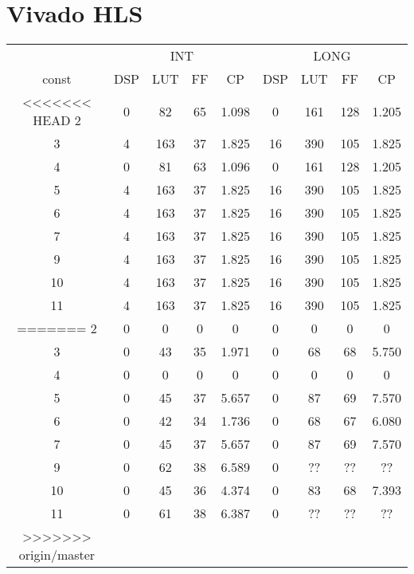 \documentclass[10pt,a4paper,twoside]{article}
\begin{document}
\section{Vivado HLS}
\begin{tabular}{|c||c|c|c|c|c|c|c|c|}
    \hline
     & \multicolumn{4}{|c}{INT} & \multicolumn{4}{|c||}{LONG}\\
    const & DSP & LUT & FF & CP & DSP & LUT & FF & CP \\
    \hline
<<<<<<< HEAD
    2 & 0 & 82 & 65 & 1.098 & 0 & 161 & 128 & 1.205 \\
    \hline
    3 & 4 & 163 & 37 & 1.825 & 16 & 390 & 105 & 1.825 \\
    \hline
    4 & 0 & 81 & 63 & 1.096 & 0 & 161 & 128 & 1.205 \\
    \hline
    5 & 4 & 163 & 37 & 1.825 & 16 & 390 & 105 & 1.825 \\
    \hline
    6 & 4 & 163 & 37 & 1.825 & 16 & 390 & 105 & 1.825 \\
    \hline
    7 & 4 & 163 & 37 & 1.825 & 16 & 390 & 105 & 1.825 \\
    \hline
    9 & 4 & 163 & 37 & 1.825 & 16 & 390 & 105 & 1.825 \\
    \hline
    10 & 4 & 163 & 37 & 1.825 & 16 & 390 & 105 & 1.825 \\
    \hline
    11 & 4 & 163 & 37 & 1.825 & 16 & 390 & 105 & 1.825\\
=======
    2 & 0 & 0 & 0 & 0 & 0 & 0 & 0 & 0 \\
    \hline
    3 & 0 & 43 & 35 & 1.971 & 0 & 68 & 68 & 5.750 \\
    \hline
    4 & 0 & 0 & 0 & 0 & 0 & 0 & 0 & 0 \\
    \hline
    5 & 0 & 45 & 37 & 5.657 & 0 & 87 & 69 & 7.570 \\
    \hline
    6 & 0 & 42 & 34 & 1.736 & 0 & 68 & 67 & 6.080 \\
    \hline
    7 & 0 & 45 & 37 & 5.657 & 0 & 87 & 69 & 7.570 \\
    \hline
    9 & 0 & 62 & 38 & 6.589 & 0 & ?? & ?? & ?? \\
    \hline
    10 & 0 & 45 & 36 & 4.374 & 0 & 83 & 68 & 7.393 \\
    \hline
    11 & 0 & 61 & 38 & 6.387 & 0 & ?? & ?? & ?? \\
>>>>>>> origin/master
    \hline
\end{tabular}
\end{document}
